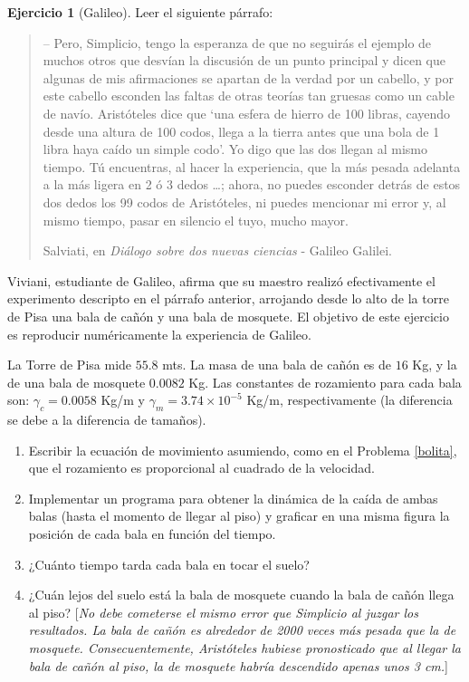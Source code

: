 \documentclass[12pt, a4paper]{amsbook}
\theoremstyle{remark}
\theoremstyle{definition}
\newtheorem{ejer}[teo]{Ejercicio}
\numberwithin{section}{chapter}
\numberwithin{subsection}{section}
\numberwithin{equation}{section}
\numberwithin{figure}{chapter}
\begin{document}
\begin{ejer}[Galileo] Leer el siguiente párrafo:
\begin{quotation}
-- Pero, Simplicio, tengo la esperanza de que no seguirás el ejemplo de muchos otros que desvían la discusión de un punto principal y dicen que algunas de mis afirmaciones se apartan de la verdad por un cabello, y por este cabello esconden las faltas de otras teorías tan gruesas como un cable de navío. Aristóteles dice que `una esfera de hierro de 100 libras, cayendo desde una altura de 100 codos, llega a la tierra antes que una bola de 1 libra haya caído un simple codo'. Yo digo que las dos llegan al mismo tiempo. Tú encuentras, al hacer la experiencia, que la más pesada adelanta a la más ligera en 2 ó 3 dedos …; ahora, no puedes esconder detrás de estos dos dedos los 99 codos de Aristóteles, ni puedes mencionar mi error y, al mismo tiempo, pasar en silencio el tuyo, mucho mayor.
\begin{flushright}
 Salviati, en \emph{Diálogo sobre dos nuevas ciencias} - Galileo Galilei.
 \end{flushright}
\end{quotation}

Viviani, estudiante de Galileo, afirma que su maestro realizó efectivamente el experimento descripto en el párrafo anterior, arrojando desde lo alto de la torre de Pisa una bala de cañón y una bala de mosquete. El objetivo de este ejercicio es reproducir numéricamente la experiencia de Galileo.

La Torre de Pisa mide $55.8$ mts. La masa de una bala de cañón es de $16$ Kg, y la de una bala de mosquete $0.0082$ Kg. Las constantes de rozamiento para cada bala son: $\gamma_c = 0.0058$ Kg/m y $\gamma_m = 3.74\times 10^{-5}$ Kg/m, respectivamente (la diferencia se debe a la diferencia de tamaños).

\begin{enumerate}
 \item Escribir la ecuación de movimiento asumiendo, como en el Problema \ref{bolita}, que el rozamiento es proporcional al cuadrado de la velocidad.
 \item Implementar un programa para obtener la dinámica de la caída de ambas balas (hasta el momento de llegar al piso) y graficar en una misma figura la posición de cada bala en función del tiempo. 
 \item ¿Cuánto tiempo tarda cada bala en tocar el suelo?
 \item ¿Cuán lejos del suelo está la bala de mosquete cuando la bala de cañón llega al piso? [\emph{No debe cometerse el mismo error que Simplicio al juzgar los resultados. La bala de cañón es alrededor de 2000 veces más pesada que la de mosquete. Consecuentemente, Aristóteles hubiese pronosticado que al llegar la bala de cañón al piso, la de mosquete habría descendido apenas unos 3 cm.}]
\end{enumerate}
\end{ejer}
\end{document}
